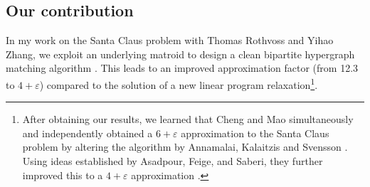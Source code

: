 

\subsection{Our contribution}
In my work on the Santa Claus problem with Thomas Rothvoss and Yihao Zhang,
we exploit an underlying matroid to design a clean bipartite hypergraph matching algorithm \cite{DaviesRZ20}. 
This leads to an improved approximation factor (from 12.3 to $4+ \varepsilon$) compared to the solution of a new linear program relaxation\footnote{After obtaining our results, 
we learned that Cheng and Mao simultaneously and independently obtained 
a $6 + \varepsilon$ approximation to the Santa Claus problem
by altering the algorithm by Annamalai, Kalaitzis and Svensson \cite{ChengM18}.  
Using ideas established by Asadpour, Feige, and Saberi, they further improved this
to a $4 + \varepsilon$ approximation \cite{CM19, SantaClaus-AsadpourFeigeSaberi-APPROX2008}.}.

